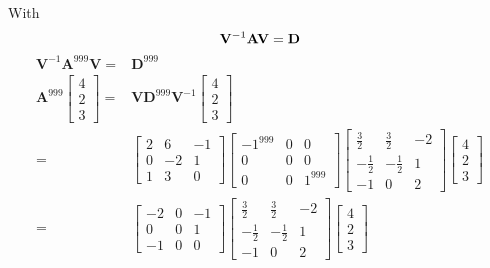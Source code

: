 \documentclass[12pt]{article}
\newcommand{\matr}[1]{\mathbf{#1}}
\begin{document}
With
\begin{equation}
	\matr V^{-1} \matr A \matr V = \matr D \\
\end{equation}
\begin{align}
	\matr V ^{-1} \matr A ^ {999} \matr V =& \matr D^{999} \\
	\matr A ^ {999} \begin{bmatrix}4\\2\\3\end{bmatrix}=& \matr V \matr D ^ {999} \matr V ^ {-1}\begin{bmatrix}4\\2\\3\end{bmatrix} \\
	= & \left[\begin{matrix}2 & 6 & -1 \\0 & -2 & 1\\1 & 3 & 0\end{matrix}\right]
	\left[\begin{matrix}-1^{999} & 0 & 0\\0 & 0 & 0\\0 & 0 & 1^{999}\end{matrix}\right]
	\left[\begin{matrix}\frac{3}{2} & \frac{3}{2} & -2\\- \frac{1}{2} & - \frac{1}{2} & 1\\-1 & 0 & 2\end{matrix}\right]
	\left[\begin{matrix}4\\2\\3\end{matrix}\right] \\
	=&\left[\begin{matrix}-2 & 0 & -1\\0 & 0 & 1\\-1 & 0 & 0\end{matrix}\right]
	\left[\begin{matrix}\frac{3}{2} & \frac{3}{2} & -2\\- \frac{1}{2} & - \frac{1}{2} & 1\\-1 & 0 & 2\end{matrix}\right]
	\left[\begin{matrix}4\\2\\3\end{matrix}\right] \\

\end{align}
\end{document}
